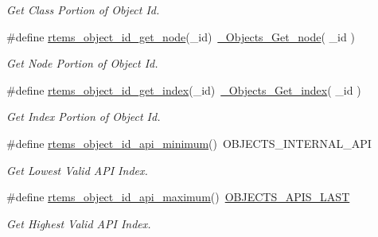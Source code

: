 \begin{DoxyCompactItemize}
\begin{DoxyCompactList}\small\item\em Get Class Portion of Object Id. \end{DoxyCompactList}\item 
\#define \mbox{\hyperlink{group__ClassicClassInfo_gadc791c4cbb38bb872350921b292caf1d}{rtems\+\_\+object\+\_\+id\+\_\+get\+\_\+node}}(\+\_\+id)~\mbox{\hyperlink{group__RTEMSScoreObject_ga2a5fbd3f068704dab10f651f6aa12d6d}{\+\_\+\+Objects\+\_\+\+Get\+\_\+node}}( \+\_\+id )
\begin{DoxyCompactList}\small\item\em Get Node Portion of Object Id. \end{DoxyCompactList}\item 
\#define \mbox{\hyperlink{group__ClassicClassInfo_ga3a392f8dd107326289aecdf1543f0d94}{rtems\+\_\+object\+\_\+id\+\_\+get\+\_\+index}}(\+\_\+id)~\mbox{\hyperlink{group__RTEMSScoreObject_ga22cdf45f285840b7728b06197a7f4627}{\+\_\+\+Objects\+\_\+\+Get\+\_\+index}}( \+\_\+id )
\begin{DoxyCompactList}\small\item\em Get Index Portion of Object Id. \end{DoxyCompactList}\item 
\#define \mbox{\hyperlink{group__ClassicClassInfo_gad8673b7734f578045d2168db1752b917}{rtems\+\_\+object\+\_\+id\+\_\+api\+\_\+minimum}}()~O\+B\+J\+E\+C\+T\+S\+\_\+\+I\+N\+T\+E\+R\+N\+A\+L\+\_\+\+A\+PI
\begin{DoxyCompactList}\small\item\em Get Lowest Valid A\+PI Index. \end{DoxyCompactList}\item 
\#define \mbox{\hyperlink{group__ClassicClassInfo_ga6e35126ecf7d4d2dba40a58980e7bc7c}{rtems\+\_\+object\+\_\+id\+\_\+api\+\_\+maximum}}()~\mbox{\hyperlink{group__RTEMSScoreObject_ga238bef3e73c68907c9fbc51497250c13}{O\+B\+J\+E\+C\+T\+S\+\_\+\+A\+P\+I\+S\+\_\+\+L\+A\+ST}}
\begin{DoxyCompactList}\small\item\em Get Highest Valid A\+PI Index. \end{DoxyCompactList}\end{DoxyCompactItemize}
